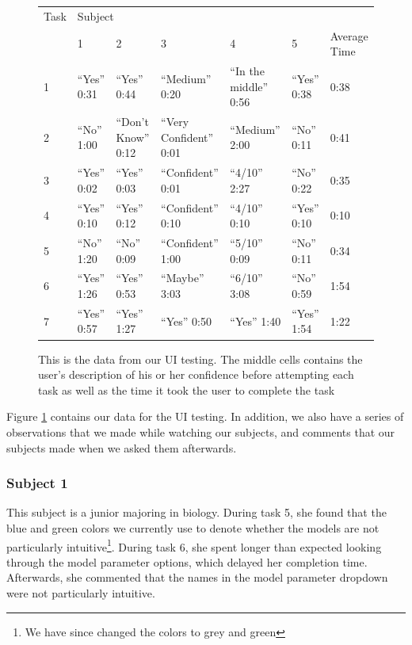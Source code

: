 \documentclass[letterpaper,10pt, onecolumn, draftclsnofoot]{IEEEtran}
\begin{document}
\begin{figure}
\begin{tabularx}{\textwidth}{|X|X|X|X|X|X|X|}
\hline
Task & \multicolumn{6}{X|}{Subject} \\
\cline{2-7}
& 1 & 2 & 3 & 4 & 5 & Average Time \\
\hline
1    & ``Yes'' 0:31 & ``Yes'' 0:44        & ``Medium'' 0:20         & ``In the middle'' 0:56 & ``Yes'' 0:38 & 0:38 \\
\hline
2    & ``No'' 1:00  & ``Don't Know'' 0:12 & ``Very Confident'' 0:01 & ``Medium'' 2:00        & ``No'' 0:11  & 0:41 \\
\hline
3    & ``Yes'' 0:02 & ``Yes'' 0:03        & ``Confident'' 0:01      & ``4/10'' 2:27          & ``No'' 0:22  & 0:35 \\
\hline
4    & ``Yes'' 0:10 & ``Yes'' 0:12        & ``Confident'' 0:10      & ``4/10'' 0:10          & ``Yes'' 0:10 & 0:10 \\
\hline
5    & ``No'' 1:20  & ``No'' 0:09         & ``Confident'' 1:00      & ``5/10'' 0:09          & ``No'' 0:11  & 0:34 \\
\hline
6    & ``Yes'' 1:26 & ``Yes'' 0:53        & ``Maybe'' 3:03          & ``6/10'' 3:08          & ``No'' 0:59  & 1:54 \\
\hline
7    & ``Yes'' 0:57 & ``Yes'' 1:27        & ``Yes'' 0:50            & ``Yes'' 1:40           & ``Yes'' 1:54 & 1:22 \\
\hline

\end{tabularx}
\caption{This is the data from our UI testing. The middle cells contains the user's description of his or her confidence before attempting each task as well as the time it took the user to complete the task}
\label{fig:uiTestData1}
\end{figure}

Figure \ref{fig:uiTestData1} contains our data for the UI testing. In addition, we also have a series of observations that we made while watching our subjects, and comments that our subjects made when we asked them afterwards.

\subsubsection{Subject 1}
This subject is a junior majoring in biology. During task 5, she found that the blue and green colors we currently use to denote whether the models are not particularly intuitive\footnote{We have since changed the colors to grey and green}. During task 6, she spent longer than expected looking through the model parameter options, which delayed her completion time. Afterwards, she commented that the names in the model parameter dropdown were not particularly intuitive.
\end{document}

